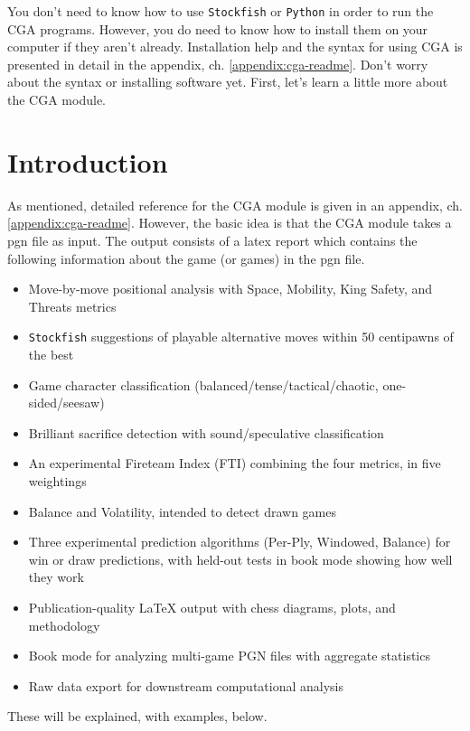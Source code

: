\documentclass[12pt]{book}
\begin{document}
You don't need to know how to use {\tt Stockfish} or {\tt Python}
in order to run the CGA programs. However, you do need to know how to
install them on your computer if they aren't already.
Installation help and the syntax for using CGA is presented
in detail in the appendix,
ch. \ref{appendix:cga-readme}. Don't worry about the syntax or
installing software yet. First, let's learn a little more
about the CGA module.


\chapter{Introduction}

As mentioned,
detailed reference for the CGA module is given in an appendix,
ch. \ref{appendix:cga-readme}.
However, the basic idea is that the CGA module takes a pgn file as input.
The output consists of a latex report which contains the following
information about the game (or games) in the pgn file.

\begin{itemize}
\item  
Move-by-move positional analysis with Space, Mobility, King Safety, and
Threats metrics
\item  
{\tt Stockfish} suggestions of playable alternative moves within 50 centipawns
of the best 
\item  
  Game character classification (balanced/tense/tactical/chaotic,
  one-sided/seesaw)
\item  
Brilliant sacrifice detection with sound/speculative classification
\item  
An experimental Fireteam Index (FTI) combining the four metrics, in five weightings
\item
Balance and Volatility, intended to detect drawn games
\item  
Three experimental prediction algorithms (Per-Ply, Windowed, Balance) for win or draw
predictions, with held-out tests in book mode showing how well they work
\item  
Publication-quality LaTeX output with chess diagrams, plots, and methodology
\item  
Book mode for analyzing multi-game PGN files with aggregate statistics
\item  
Raw data export for downstream computational analysis

\end{itemize}

These will be explained, with examples, below.
\end{document}
